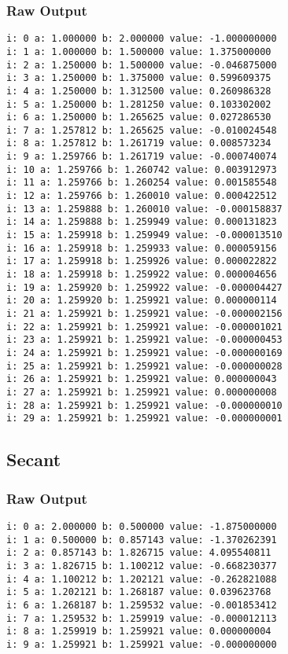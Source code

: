 \documentclass[11pt]{article} %
\begin{document}
\subsubsection*{Raw Output}
\begin{verbatim}
i: 0 a: 1.000000 b: 2.000000 value: -1.000000000 
i: 1 a: 1.000000 b: 1.500000 value: 1.375000000 
i: 2 a: 1.250000 b: 1.500000 value: -0.046875000 
i: 3 a: 1.250000 b: 1.375000 value: 0.599609375 
i: 4 a: 1.250000 b: 1.312500 value: 0.260986328 
i: 5 a: 1.250000 b: 1.281250 value: 0.103302002 
i: 6 a: 1.250000 b: 1.265625 value: 0.027286530 
i: 7 a: 1.257812 b: 1.265625 value: -0.010024548 
i: 8 a: 1.257812 b: 1.261719 value: 0.008573234 
i: 9 a: 1.259766 b: 1.261719 value: -0.000740074 
i: 10 a: 1.259766 b: 1.260742 value: 0.003912973 
i: 11 a: 1.259766 b: 1.260254 value: 0.001585548 
i: 12 a: 1.259766 b: 1.260010 value: 0.000422512 
i: 13 a: 1.259888 b: 1.260010 value: -0.000158837 
i: 14 a: 1.259888 b: 1.259949 value: 0.000131823 
i: 15 a: 1.259918 b: 1.259949 value: -0.000013510 
i: 16 a: 1.259918 b: 1.259933 value: 0.000059156 
i: 17 a: 1.259918 b: 1.259926 value: 0.000022822 
i: 18 a: 1.259918 b: 1.259922 value: 0.000004656 
i: 19 a: 1.259920 b: 1.259922 value: -0.000004427 
i: 20 a: 1.259920 b: 1.259921 value: 0.000000114 
i: 21 a: 1.259921 b: 1.259921 value: -0.000002156 
i: 22 a: 1.259921 b: 1.259921 value: -0.000001021 
i: 23 a: 1.259921 b: 1.259921 value: -0.000000453 
i: 24 a: 1.259921 b: 1.259921 value: -0.000000169 
i: 25 a: 1.259921 b: 1.259921 value: -0.000000028 
i: 26 a: 1.259921 b: 1.259921 value: 0.000000043 
i: 27 a: 1.259921 b: 1.259921 value: 0.000000008 
i: 28 a: 1.259921 b: 1.259921 value: -0.000000010 
i: 29 a: 1.259921 b: 1.259921 value: -0.000000001 
\end{verbatim}
\subsection*{Secant}
\subsubsection*{Raw Output}
\begin{verbatim}
i: 0 a: 2.000000 b: 0.500000 value: -1.875000000 
i: 1 a: 0.500000 b: 0.857143 value: -1.370262391 
i: 2 a: 0.857143 b: 1.826715 value: 4.095540811 
i: 3 a: 1.826715 b: 1.100212 value: -0.668230377 
i: 4 a: 1.100212 b: 1.202121 value: -0.262821088 
i: 5 a: 1.202121 b: 1.268187 value: 0.039623768 
i: 6 a: 1.268187 b: 1.259532 value: -0.001853412 
i: 7 a: 1.259532 b: 1.259919 value: -0.000012113 
i: 8 a: 1.259919 b: 1.259921 value: 0.000000004 
i: 9 a: 1.259921 b: 1.259921 value: -0.000000000 
\end{verbatim}
\end{document}

